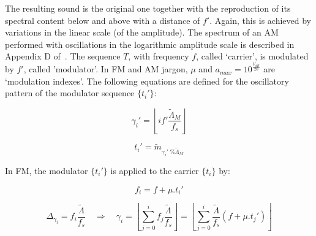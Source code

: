 
The resulting sound is the original one together with the
reproduction of its spectral content below and above with a distance of $f'$.
Again, this is achieved by variations in the linear scale (of the amplitude).
The spectrum of an AM performed with oscillations in the logarithmic amplitude scale is described in Appendix D of~\cite{dissertacao}.
The sequence $T$, with frequency $f$, called `carrier', is modulated by
$f'$, called 'modulator'. In FM and AM jargon, $\mu$ and
$a_{max}=10^{\frac{V_{dB}}{20}}$ are `modulation indexes'.
The following equations are defined for the oscillatory pattern of the modulator sequence $\{t_i'\}$:

\begin{equation}\label{fmGammaAux}
\gamma_i'=\left \lfloor i f' \frac{\widetilde{\Lambda}_M}{f_s} \right \rfloor
\end{equation}

\begin{equation}\label{fmAux}
t_i'=\widetilde{m}_{\gamma_i' \;\% \widetilde{\Lambda}_M}
\end{equation}

In FM, the modulator $\{t_i'\}$ is applied to the carrier $\{t_i\}$ by:

\begin{equation}\label{fmF}
f_i=f + \mu . t_i'
\end{equation}

\begin{equation}\label{fmGamma}
\Delta_{\gamma_i}=f_i\frac{\widetilde{\Lambda}}{f_s} \quad \Rightarrow \quad \gamma_i = \left \lfloor \sum_{j=0}^{i} f_j \frac{\widetilde{\Lambda}}{f_s} \right \rfloor = \left \lfloor \sum_{j=0}^{i} \frac{\widetilde{\Lambda}}{f_s}(f+\mu . t_j') \right\rfloor
\end{equation}

